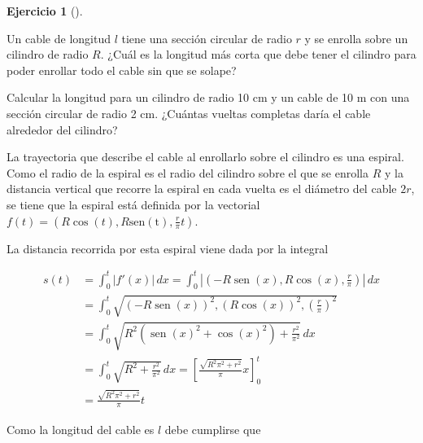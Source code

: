 \documentclass[
  spanish,
  a4paper,
]{scrreport}
\theoremstyle{definition}
\newtheorem{exercise}{Ejercicio}[chapter]
\theoremstyle{remark}
\begin{document}
\begin{exercise}[]\protect\hypertarget{exr-4}{}\label{exr-4}

Un cable de longitud \(l\) tiene una sección circular de radio \(r\) y
se enrolla sobre un cilindro de radio \(R\). ¿Cuál es la longitud más
corta que debe tener el cilindro para poder enrollar todo el cable sin
que se solape?

Calcular la longitud para un cilindro de radio 10 cm y un cable de 10 m
con una sección circular de radio 2 cm. ¿Cuántas vueltas completas daría
el cable alrededor del cilindro?

\end{exercise}

\begin{tcolorbox}[enhanced jigsaw, arc=.35mm, bottomrule=.15mm, bottomtitle=1mm, breakable, colback=white, colbacktitle=quarto-callout-tip-color!10!white, colframe=quarto-callout-tip-color-frame, coltitle=black, left=2mm, leftrule=.75mm, opacityback=0, opacitybacktitle=0.6, rightrule=.15mm, title=\textcolor{quarto-callout-tip-color}{\faLightbulb}\hspace{0.5em}{Solución}, titlerule=0mm, toprule=.15mm, toptitle=1mm]

La trayectoria que describe el cable al enrollarlo sobre el cilindro es
una espiral. Como el radio de la espiral es el radio del cilindro sobre
el que se enrolla \(R\) y la distancia vertical que recorre la espiral
en cada vuelta es el diámetro del cable \(2r\), se tiene que la espiral
está definida por la vectorial
\(f(t) = (R\cos(t), R\operatorname{sen(t)}, \frac{r}{\pi}t)\).

La distancia recorrida por esta espiral viene dada por la integral

\begin{align*}
s(t) 
&= \int_0^t |f'(x)|\,dx 
= \int_0^t \left|\left(-R\operatorname{sen}(x), R\cos(x), \frac{r}{\pi}\right)\right|\, dx \\
&= \int_0^t \sqrt{(-R\operatorname{sen}(x))^2, (R\cos(x))^2, \left(\frac{r}{\pi}\right)^2} \\
&= \int_0^t \sqrt{R^2(\operatorname{sen}(x)^2+\cos(x)^2) + \frac{r^2}{\pi^2}}\, dx \\
&= \int_0^t \sqrt{R^2 + \frac{r^2}{\pi^2}}\, dx
= \left[\frac{\sqrt{R^2\pi^2+r^2}}{\pi} x\right]_0^t \\
&= \frac{\sqrt{R^2\pi^2+r^2}}{\pi}t
\end{align*}

Como la longitud del cable es \(l\) debe cumplirse que


\end{tcolorbox}
\end{document}
